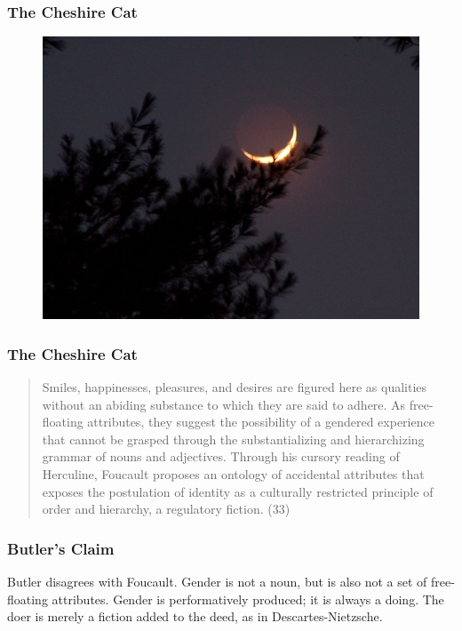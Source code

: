 \documentclass[xcolor=dvipsnames]{beamer}
\begin{document}
\begin{frame}
  \frametitle{The Cheshire Cat}
  \begin{figure}[h]
    \includegraphics[scale=0.45]{./cheshire.jpg}
  \end{figure}
\end{frame}

\begin{frame}
  \frametitle{The Cheshire Cat}
  \begin{quote}
    Smiles, happinesses, pleasures, and desires are figured here as
    qualities without an abiding substance to which they are said to
    adhere. As free-floating attributes, they suggest the possibility
    of a gendered experience that cannot be grasped through the
    substantializing and hierarchizing grammar of nouns and
    adjectives. Through his cursory reading of Herculine, Foucault
    proposes an ontology of accidental attributes that exposes the
    postulation of identity as a culturally restricted principle of
    order and hierarchy, a regulatory fiction. (33)
  \end{quote}
\end{frame}

\begin{frame}
  \frametitle{Butler's Claim}
  Butler disagrees with Foucault. Gender is not a noun, but is also
  not a set of free-floating attributes. Gender is performatively
  produced; it is always a doing. The doer is merely a fiction added
  to the deed, as in Descartes-Nietzsche.
\end{frame}
\end{document}
